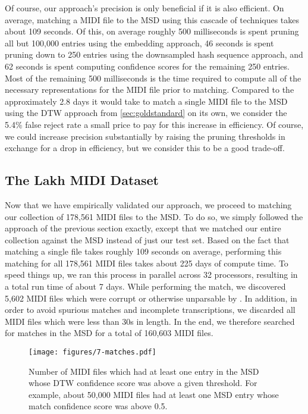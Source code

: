 Of course, our approach's precision is only beneficial if it is also efficient.
On average, matching a MIDI file to the MSD using this cascade of techniques takes about 109 seconds.
Of this, on average roughly 500 milliseconds is spent pruning all but 100,000 entries using the embedding approach, 46 seconds is spent pruning down to 250 entries using the downsampled hash sequence approach, and 62 seconds is spent computing confidence scores for the remaining 250 entries.
Most of the remaining 500 milliseconds is the time required to compute all of the necessary representations for the MIDI file prior to matching.
Compared to the approximately 2.8 days it would take to match a single MIDI file to the MSD using the DTW approach from \cref{sec:goldstandard} on its own, we consider the 5.4\% false reject rate a small price to pay for this increase in efficiency.
Of course, we could increase precision substantially by raising the pruning thresholds in exchange for a drop in efficiency, but we consider this to be a good trade-off.

\subsection{The Lakh MIDI Dataset}

Now that we have empirically validated our approach, we proceed to matching our collection of 178,561 MIDI files to the MSD.
To do so, we simply followed the approach of the previous section exactly, except that we matched our entire collection against the MSD instead of just our test set.
Based on the fact that matching a single file takes roughly 109 seconds on average, performing this matching for all 178,561 MIDI files takes about 225 days of compute time.
To speed things up, we ran this process in parallel across 32 processors, resulting in a total run time of about 7 days.
While performing the match, we discovered 5,602 MIDI files which were corrupt or otherwise unparsable by \prettymidi{}.
In addition, in order to avoid spurious matches and incomplete transcriptions, we discarded all MIDI files which were less than 30s in length.
In the end, we therefore searched for matches in the MSD for a total of 160,603 MIDI files.

\begin{figure}
  \texttt{[image: figures/7-matches.pdf]}
  \caption[Number of MIDI files with matches above a given confidence]{Number of MIDI files which had at least one entry in the MSD whose DTW confidence score was above a given threshold.
 For example, about 50,000 MIDI files had at least one MSD entry whose match confidence score was above 0.5.}
  \label{fig:match_confidences}
\end{figure}

